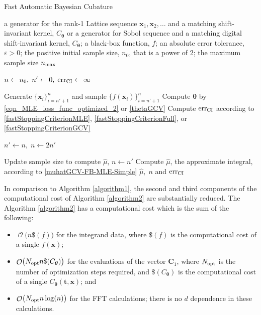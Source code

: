\documentclass{iitthesis}          %
\DeclareMathOperator{\Order}{{\mathcal O}}
\newcommand{\bm}[1]{\boldsymbol{#1}}
\newcommand{\vtheta}{{\bm{\theta}}}
\newcommand{\vC}{\bm{C}}
\newcommand{\vt}{\bm{t}}
\newcommand{\vx}{\bm{x}}
\newcommand{\hmu}{\widehat{\mu}}
\newcommand{\opt}{\textup{opt}}
\newcommand{\err}{\textup{err}}
\begin{document}
\begin{algorithm}
	\caption{Fast Automatic Bayesian Cubature}\label{algorithm2}
	\begin{algorithmic}[1]
		\Require a generator for the rank-1 Lattice sequence
		$\vx_1, \vx_2, \ldots$ and a matching shift-invariant  kernel, $C_\vtheta$ 
		or a generator for Sobol sequence and a matching digital shift-invariant kernel, $C_\vtheta$;
		a black-box function, $f$; 
		an absolute error tolerance,
		$\varepsilon>0$; the positive initial sample size, $n_0$, that is a power of $2$;
		the maximum sample size $n_{\textup{max}}$
		
		\State $n \gets n_0, \; n' \gets 0, \; \err_{\textup{CI}} \gets \infty$
		
		\While{$\err_{\textup{CI}} > \varepsilon$ and $n \le n_{\textup{max}}$}
		
		\State\label{LoopStartA2}Generate $\{ \vx_i\}_{i=n' + 1}^{n}$ and sample $\{f(\vx_i)\}_{i=n'+1}^{n}$
		\State Compute $\vtheta$ by \eqref{eqn_MLE_loss_func_optimized_2} or \eqref{thetaGCV}
		\State Compute $\err_{\textup{CI}}$  according to \eqref{fastStoppingCriterionMLE}, \eqref{fastStoppingCriterionFull}, or \eqref{fastStoppingCriterionGCV}
		
		\State	$n' \gets n, \; n \gets 2n'$
		
		\EndWhile
		
		\State Update sample size to compute $\hmu$, $n \gets n'$
		\State Compute $\hmu$, the approximate integral,   according to \eqref{muhatGCV-FB-MLE-Simple}
		\State \Return $\hmu, \; n$  and $\err_{\textup{CI}}$
	\end{algorithmic}
\end{algorithm}

In comparison to Algorithm \ref{algorithm1}, the second and third components of the computational cost of Algorithm  \ref{algorithm2} are substantially reduced.
The Algorithm \ref{algorithm2} has a computational cost which is the sum of the following:
\begin{itemize}
	\item $\Order\bigl(n\$(f) \bigr)$ for the integrand data, where $\$(f)$ is the computational cost of a single $f(\vx)$;
	
	\item $\Order\bigl(N_{\opt} n \$(C_\vtheta) \bigr)$ for the evaluations of the vector $\vC_{1}$, where $N_\opt$ is the number of optimization steps required, and  $\$(C_\vtheta)$ is the computational cost of a single $C_\vtheta(\vt,\vx)$; and
	
	\item $\Order\bigl(N_{\opt} n \log(n) \bigr)$ for the FFT calculations; there is no $d$ dependence in these calculations.
	
\end{itemize}
\end{document}

